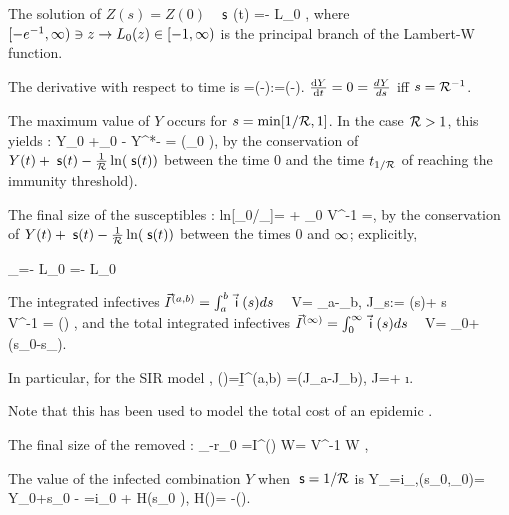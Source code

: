 The solution of $Z(s)=Z(0)$  \wrt\ $\;\mathsf s$ \mbe
{}
  \s(t) =-  L_0 ,\ee
   where $[-e^{-1}, \infty) \ni z \to L_0(z) \in [-1,\infty) $ is the principal branch of the  Lambert-W function.

   \im The derivative with respect to time is
=\left(\s-\right)\vi  \bb:=\left(\s-\right)\y.\ee
\Thr $\frac{\text{d} Y}{\text{d} t}=0=\frac{dY}{ds}$ iff $ s=\mathcal R^{-1}$.

\im
The maximum value of $Y$ occurs for $s =  \min[1/\mathcal R,1]$.
In the case $\mathcal R >1$,
this yields \cite[Sec. 2.1]{Feng}:
 Y_0 +\s_0 - Y^*- {\mR} =  {\mR} \ln({\s_0 \mR}),\ee
by the conservation of $Y(t)+\;\mathsf s(t)-\frac 1 {\mathcal R} \ln({\;\mathsf s(t)})$ between  the time $0$ and the time $t_{1/\mathcal R}$ of reaching the immunity threshold).



\im The final size  of the susceptibles  \sats \cite[Thm.5.1]{Arino}:
  {ln[\s_0/\s_\I]}={\mR} +  \vi _0 V^{-1} \bb={\mR}, \ee
by the conservation of $Y(t)+\;\mathsf s(t)-\frac 1 {\mathcal R} \ln({\;\mathsf s(t)})$ between  the times $0$ and $\infty$; explicitly,

  \s_\I =-  L_0 =-  L_0 \ee


\im   The integrated infectives  $\vec I^{(a,b)}=\int_a^b \vec {\;\mathsf i} \; (s) ds$
\sats\
 \bc {} \;  V= \vJ_a-\vJ_b, \vec J_s:= \vi (s)+ s \va\\
 \pr{\vJ_a-\vJ_b} V^{-1} \bb= \log(\fr{\s(a)}{\s(b)}) \ec, \ee
 and the total integrated infectives  $\vec I^{(\infty)}=\int_0^\infty \vec {\;\mathsf i} \; (s) ds$
\sats\ \cite[(6)]{Arino}
 \vI{\I} \;  V= \vi _0+ (s_0-s_\I)\va . \ee



\beR {} In particular, for the SIR model ,
\log\left(\right)=\b I^{(a,b)} =\mR (J_a-J_b), \; J=\s+ \i.\ee

Note that this has been used to model the total cost of an epidemic \cite{gani1972cost}.
\eeR



\im The final size  of the removed  \sats:
 \vr_\I-\vec r_0 =I^{(\I)} \;  W= V^{-1} W , \ee

\im

The  value of the infected combination  $Y$  when $\;\mathsf s=1/\mathcal R$  is
 \be{im-SYR}Y_{\max}=i_{\max,\mR}(s_0,\vi _0)= Y_0+s_0 -   {\mR}  =i_0 + \f{ H(s_0 \mR)}{\mR}, \; H(\mR)= {-\ln(\mR)}.
\ee

